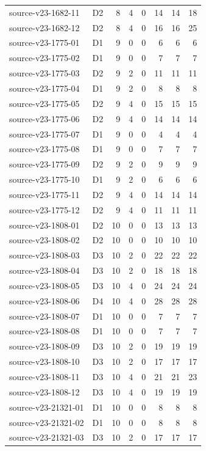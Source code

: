 \begin{longtable}{p{}lrrrrrr}
source-v23-1682-11 & D2 & 8 & 4 & 0 & 14 & 14 & 18\\
source-v23-1682-12 & D2 & 8 & 4 & 0 & 16 & 16 & 25\\
source-v23-1775-01 & D1 & 9 & 0 & 0 & 6 & 6 & 6\\
source-v23-1775-02 & D1 & 9 & 0 & 0 & 7 & 7 & 7\\
source-v23-1775-03 & D2 & 9 & 2 & 0 & 11 & 11 & 11\\
source-v23-1775-04 & D1 & 9 & 2 & 0 & 8 & 8 & 8\\
source-v23-1775-05 & D2 & 9 & 4 & 0 & 15 & 15 & 15\\
source-v23-1775-06 & D2 & 9 & 4 & 0 & 14 & 14 & 14\\
source-v23-1775-07 & D1 & 9 & 0 & 0 & 4 & 4 & 4\\
source-v23-1775-08 & D1 & 9 & 0 & 0 & 7 & 7 & 7\\
source-v23-1775-09 & D2 & 9 & 2 & 0 & 9 & 9 & 9\\
source-v23-1775-10 & D1 & 9 & 2 & 0 & 6 & 6 & 6\\
source-v23-1775-11 & D2 & 9 & 4 & 0 & 14 & 14 & 14\\
source-v23-1775-12 & D2 & 9 & 4 & 0 & 11 & 11 & 11\\
source-v23-1808-01 & D2 & 10 & 0 & 0 & 13 & 13 & 13\\
source-v23-1808-02 & D2 & 10 & 0 & 0 & 10 & 10 & 10\\
source-v23-1808-03 & D3 & 10 & 2 & 0 & 22 & 22 & 22\\
source-v23-1808-04 & D3 & 10 & 2 & 0 & 18 & 18 & 18\\
source-v23-1808-05 & D3 & 10 & 4 & 0 & 24 & 24 & 24\\
source-v23-1808-06 & D4 & 10 & 4 & 0 & 28 & 28 & 28\\
source-v23-1808-07 & D1 & 10 & 0 & 0 & 7 & 7 & 7\\
source-v23-1808-08 & D1 & 10 & 0 & 0 & 7 & 7 & 7\\
source-v23-1808-09 & D3 & 10 & 2 & 0 & 19 & 19 & 19\\
source-v23-1808-10 & D3 & 10 & 2 & 0 & 17 & 17 & 17\\
source-v23-1808-11 & D3 & 10 & 4 & 0 & 21 & 21 & 23\\
source-v23-1808-12 & D3 & 10 & 4 & 0 & 19 & 19 & 19\\
source-v23-21321-01 & D1 & 10 & 0 & 0 & 8 & 8 & 8\\
source-v23-21321-02 & D1 & 10 & 0 & 0 & 8 & 8 & 8\\
source-v23-21321-03 & D3 & 10 & 2 & 0 & 17 & 17 & 17\\

\end{longtable}
